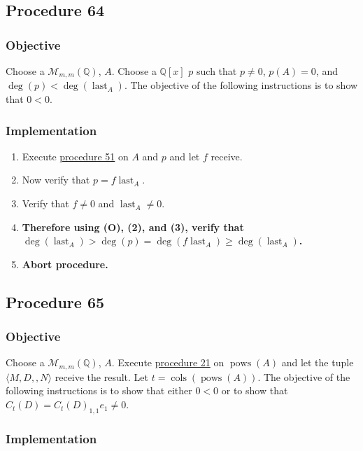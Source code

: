 \documentclass[twocolumn]{article}
\DeclareMathOperator{\pows}{pows}
\DeclareMathOperator{\cols}{cols}
\DeclareMathOperator{\last}{last}
\newcommand{\procedure}[2][]{\subsection*{Procedure #2 \ifthenelse{\equal{#1}{}}{}{(#1)}}\label{sec:procedure #2}}
\newcommand{\objective}{\subsubsection*{Objective}}
\newcommand{\implementation}{\subsubsection*{Implementation}}
\begin{document}
		\procedure{64}
			\objective
				Choose a $\mathcal{M}_{m,m}(\mathbb{Q})$, $A$. Choose a $\mathbb{Q}[x]$ $p$ such that $p\ne 0$, $p(A)=0$, and $\deg(p)<\deg(\last_A)$. The objective of the following instructions is to show that $0<0$.
			\implementation
				\begin{enumerate}
					\item Execute \hyperref[sec:procedure 51]{procedure 51} on $A$ and $p$ and let $f$ receive.
					\item Now verify that $p=f\last_A$.
					\item Verify that $f\ne 0$ and $\last_A\ne 0$.
					\item \textbf{Therefore using (O), (2), and (3), verify that $\deg(\last_A)>\deg(p)=\deg(f\last_A)\ge\deg(\last_A)$.}
					\item \textbf{Abort procedure.}
				\end{enumerate}
		\procedure{65}
			\objective
				Choose a $\mathcal{M}_{m,m}(\mathbb{Q})$, $A$. Execute \hyperref[sec:procedure 21]{procedure 21} on $\pows(A)$ and let the tuple $\langle M,D,,N\rangle$ receive the result. Let $t=\cols(\pows(A))$. The objective of the following instructions is to show that either $0<0$ or to show that ${C_t(D)}={C_t(D)}_{1,1}e_1\ne 0$.
			\implementation
\end{document}
